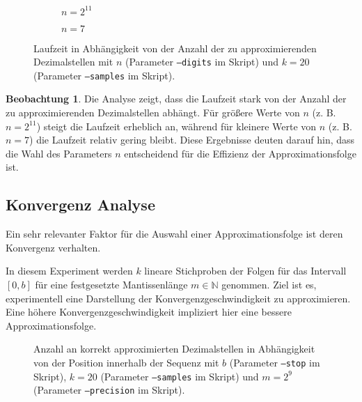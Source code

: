 \documentclass{scrartcl}
\theoremstyle{definition}
\newtheorem{approximation sequence}{Annäherungsfolge}
\newtheorem{observation}{Beobachtung}
\newcommand{\field}[1]{\mathbb{#1}}
\newcommand{\nats}{\field{N}}
\begin{document}
\begin{figure}[H]
    \centering
    \begin{subfigure}{\textwidth}
        \centering
        
        \caption{\(n = 2^{11}\)}
    \end{subfigure}
    \hfill
    \begin{subfigure}{\textwidth}
        \centering
        
        \caption{\(n = 7\)}
    \end{subfigure}
    \caption{%
        Laufzeit in Abhängigkeit von der Anzahl der zu approximierenden
        Dezimalstellen mit \(n\) (Parameter \texttt{--digits} im Skript)
        und \(k = 20\) (Parameter \texttt{--samples} im Skript).
    }
\end{figure}

\begin{observation}
    Die Analyse zeigt, dass die Laufzeit stark von der Anzahl der zu
    approximierenden Dezimalstellen abhängt. Für größere Werte von \(n\) (z. B.
    \(n = 2^{11}\)) steigt die Laufzeit erheblich an, während für kleinere
    Werte von \(n\) (z. B. \(n = 7\)) die Laufzeit relativ gering bleibt. Diese
    Ergebnisse deuten darauf hin, dass die Wahl des Parameters \(n\)
    entscheidend für die Effizienz der Approximationsfolge ist.
\end{observation}

\subsection{Konvergenz Analyse}\label{sec:convergence-analysis}

Ein sehr relevanter Faktor für die Auswahl einer Approximationsfolge ist deren
Konvergenz verhalten.

In diesem Experiment werden \(k\) lineare Stichproben der Folgen für das
Intervall \([0, b]\) für eine festgesetzte Mantissenlänge \(m \in \nats\)
genommen. Ziel ist es, experimentell eine Darstellung der
Konvergenzgeschwindigkeit zu approximieren. Eine höhere
Konvergenzgeschwindigkeit impliziert hier eine bessere Approximationsfolge.

\begin{figure}[H]
    \centering
    \subfloat[\centering \(b = 10^2\)]{%
        
    }
    \subfloat[\centering \(b = 10^6\)]{%
        
    }
    \caption{%
        Anzahl an korrekt approximierten Dezimalstellen in Abhängigkeit von der
        Position innerhalb der Sequenz mit \(b\) (Parameter \texttt{--stop} im
        Skript), \(k = 20\) (Parameter \texttt{--samples} im Skript) und \(m =
        2^9\) (Parameter \texttt{--precision} im Skript). }
    \label{fig:convergence-analysis}
\end{figure}
\end{document}
